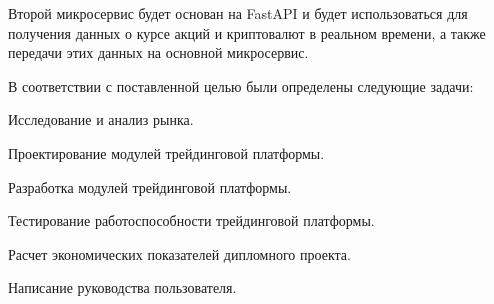 Второй микросервис будет основан на FastAPI и будет использоваться для получения данных о курсе акций и криптовалют в реальном времени, а также передачи этих данных на основной микросервис.

В соответствии с поставленной целью были определены следующие задачи:
\begin{enumerate_num}
    \item Исследование и анализ рынка.
    \item Проектирование модулей трейдинговой платформы.
    \item Разработка модулей трейдинговой платформы.
    \item Тестирование работоспособности трейдинговой платформы.
    \item Расчет экономических показателей дипломного проекта.
    \item Написание руководства пользователя.
\end{enumerate_num}


